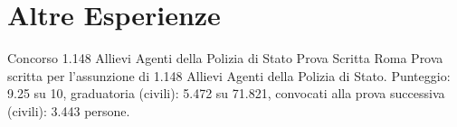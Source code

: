 %
%
%
%
%
%



\section{Altre Esperienze}

{Concorso 1.148 Allievi Agenti della Polizia di Stato}
{Prova Scritta}
{Roma}
{}
{Prova scritta per l'assunzione di 1.148 Allievi Agenti della Polizia di Stato.
Punteggio: 9.25 su 10, graduatoria (civili): 5.472 su 71.821, convocati alla
prova successiva (civili): 3.443 persone.}
